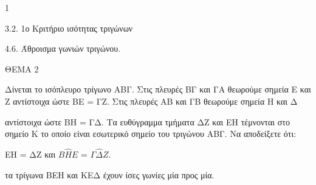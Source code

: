 \begin{ylh}{1}
    \item 3.2. 1ο Κριτήριο ισότητας τριγώνων
    \item 4.6. Άθροισμα γωνιών τριγώνου.
\end{ylh}

ΘΕΜΑ 2

Δίνεται το ισόπλευρο τρίγωνο ΑΒΓ. Στις πλευρές ΒΓ και ΓΑ θεωρούμε σημεία Ε και Ζ αντίστοιχα ώστε ΒΕ = ΓΖ. Στις πλευρές ΑΒ και ΓΒ θεωρούμε σημεία Η και Δ

αντίστοιχα ώστε ΒΗ = ΓΔ. Τα ευθύγραμμα τμήματα ΔΖ και ΕΗ τέμνονται στο σημείο Κ το οποίο είναι εσωτερικό σημείο του τριγώνου ΑΒΓ. Να αποδείξετε ότι:

\begin{alist}
\item ΕΗ = ΔΖ και $Β\widehat{Η}Ε$ = $\Gamma\widehat{\Delta}Ζ$. 

\item τα τρίγωνα ΒΕΗ και ΚΕΔ έχουν ίσες γωνίες μία προς μία. 


\begin{center}
\end{center}
\end{alist}
